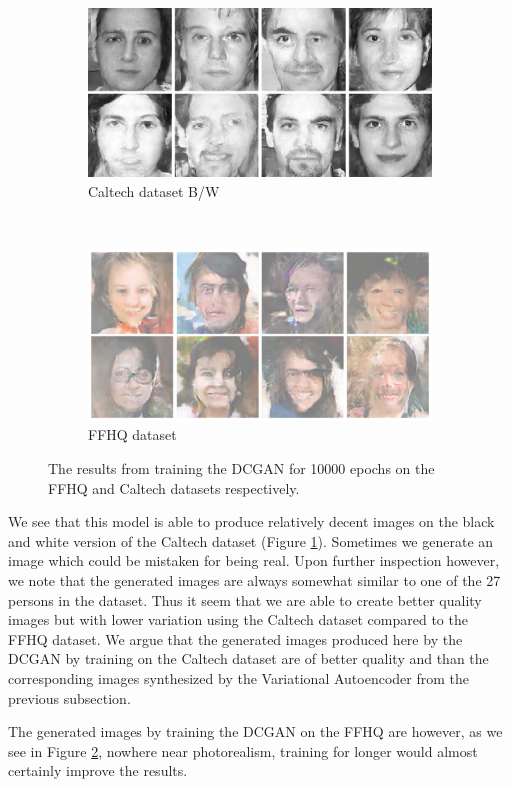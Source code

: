 \begin{figure}[h!]
    \centerings
    \begin{subfigure}[b]{0.45\textwidth}
        \includegraphics[width=\textwidth]{fig/dcgan/caltech/epoch10000}
        \caption{Caltech dataset B/W}
        \label{dcgan-caltech}
    \end{subfigure}
    ~
    \begin{subfigure}[b]{0.45\textwidth}
        \includegraphics[width=\textwidth]{fig/dcgan/ffhq/epoch10000}
        \caption{FFHQ dataset}
        \label{dcgan-ffhq}
    \end{subfigure}
    \caption{The results from training the DCGAN for 10000 epochs on the FFHQ and Caltech datasets respectively.}
    \label{dcgan-results}
\end{figure}

We see that this model is able to produce relatively decent images on the black and white version of the Caltech dataset (Figure \ref{dcgan-caltech}). Sometimes we generate an image which could be mistaken for being real. Upon further inspection however, we note that the generated images are always somewhat similar to one of the 27 persons in the dataset. Thus it seem that we are able to create better quality images but with lower variation using the Caltech dataset compared to the FFHQ dataset. We argue that the generated images produced here by the DCGAN by training on the Caltech dataset are of better quality and than the corresponding images synthesized by the Variational Autoencoder from the previous subsection.

The generated images by training the DCGAN on the FFHQ are however, as we see in Figure \ref{dcgan-ffhq}, nowhere near photorealism, training for longer would almost certainly improve the results. 
